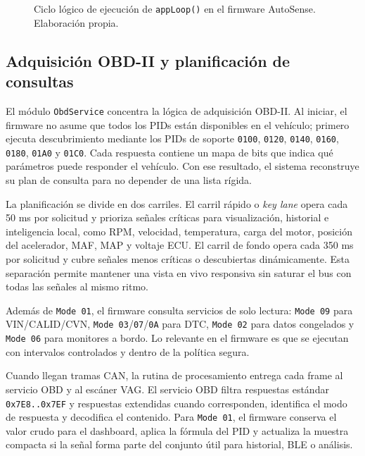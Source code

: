 \documentclass[12pt,letterpaper]{report}
\begin{document}
\begin{figure}[!htbp]
{
}
\endgroup
    \caption{Ciclo lógico de ejecución de \texttt{appLoop()} en el firmware AutoSense. Elaboración propia.}
\label{fig:firmware-apploop}
\end{figure}

\subsection{Adquisición OBD-II y planificación de consultas}

El módulo \texttt{ObdService} concentra la lógica de adquisición OBD-II. Al iniciar, el firmware no asume que todos los PIDs están disponibles en el vehículo; primero ejecuta descubrimiento mediante los PIDs de soporte \texttt{0100}, \texttt{0120}, \texttt{0140}, \texttt{0160}, \texttt{0180}, \texttt{01A0} y \texttt{01C0}. Cada respuesta contiene un mapa de bits que indica qué parámetros puede responder el vehículo. Con ese resultado, el sistema reconstruye su plan de consulta para no depender de una lista rígida.

La planificación se divide en dos carriles. El carril rápido o \emph{key lane} opera cada 50 ms por solicitud y prioriza señales críticas para visualización, historial e inteligencia local, como RPM, velocidad, temperatura, carga del motor, posición del acelerador, MAF, MAP y voltaje ECU. El carril de fondo opera cada 350 ms por solicitud y cubre señales menos críticas o descubiertas dinámicamente. Esta separación permite mantener una vista en vivo responsiva sin saturar el bus con todas las señales al mismo ritmo.

Además de \texttt{Mode 01}, el firmware consulta servicios de solo lectura: \texttt{Mode 09} para VIN/CALID/CVN, \texttt{Mode 03}/\texttt{07}/\texttt{0A} para DTC, \texttt{Mode 02} para datos congelados y \texttt{Mode 06} para monitores a bordo. Lo relevante en el firmware es que se ejecutan con intervalos controlados y dentro de la política segura.

Cuando llegan tramas CAN, la rutina de procesamiento entrega cada frame al servicio OBD y al escáner VAG. El servicio OBD filtra respuestas estándar \texttt{0x7E8..0x7EF} y respuestas extendidas cuando corresponden, identifica el modo de respuesta y decodifica el contenido. Para \texttt{Mode 01}, el firmware conserva el valor crudo para el dashboard, aplica la fórmula del PID y actualiza la muestra compacta si la señal forma parte del conjunto útil para historial, BLE o análisis.
\end{document}
